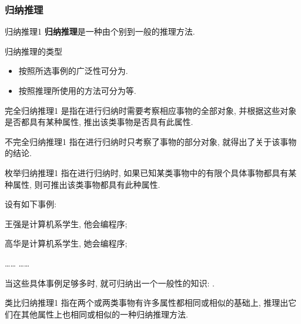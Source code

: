 \subsubsection{归纳推理}
\vspace{0.3cm}
\begin{mydef}{归纳推理}{1}
    \textbf{归纳推理}是一种由个别到一般的推理方法.
\end{mydef}
\begin{example}
归纳推理的类型
\begin{itemize}
    \item 按照所选事例的广泛性可分为.
    \item 按照推理所使用的方法可分为等.
\end{itemize}
\end{example}
\vspace{0.3cm}
\begin{mydef}{完全归纳推理}{1}
    是指在进行归纳时需要考察相应事物的全部对象, 并根据这些对象是否都具有某种属性, 推出该类事物是否具有此属性.
\end{mydef}
\vspace{0.3cm}
\begin{mydef}{不完全归纳推理}{1}
    指在进行归纳时只考察了事物的部分对象, 就得出了关于该事物的结论.
\end{mydef}
\vspace{0.3cm}
\begin{mydef}{枚举归纳推理}{1}
    指在进行归纳时, 如果已知某类事物中的有限个具体事物都具有某种属性, 则可推出该类事物都具有此种属性.
\end{mydef}
\begin{example}
设有如下事例:

    王强是计算机系学生, 他会编程序;

    高华是计算机系学生, 她会编程序;

     ……                ……
\end{example}
    当这些具体事例足够多时, 就可归纳出一个一般性的知识: .
\vspace{0.3cm}
\begin{mydef}{类比归纳推理}{1}
指在两个或两类事物有许多属性都相同或相似的基础上, 推理出它们在其他属性上也相同或相似的一种归纳推理方法.
\end{mydef}
